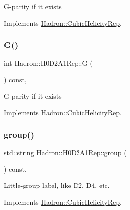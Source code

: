 G-\/parity if it exists 

Implements \mbox{\hyperlink{structHadron_1_1CubicHelicityRep_a50689f42be1e6170aa8cf6ad0597018b}{Hadron\+::\+Cubic\+Helicity\+Rep}}.

\mbox{\label{structHadron_1_1H0D2A1Rep_ae1ebac233a357e3e0be88511400434bc}} 
\subsubsection{\texorpdfstring{G()}{G()}\hspace{0.1cm}{\footnotesize\ttfamily [2/2]}}
{\footnotesize\ttfamily int Hadron\+::\+H0\+D2\+A1\+Rep\+::G (\begin{DoxyParamCaption}{ }\end{DoxyParamCaption}) const\hspace{0.3cm}{\ttfamily [inline]}, {\ttfamily [virtual]}}

G-\/parity if it exists 

Implements \mbox{\hyperlink{structHadron_1_1CubicHelicityRep_a50689f42be1e6170aa8cf6ad0597018b}{Hadron\+::\+Cubic\+Helicity\+Rep}}.

\mbox{\label{structHadron_1_1H0D2A1Rep_a2a8749e8be7f24396cd3156be2e1b037}} 
\subsubsection{\texorpdfstring{group()}{group()}\hspace{0.1cm}{\footnotesize\ttfamily [1/3]}}
{\footnotesize\ttfamily std\+::string Hadron\+::\+H0\+D2\+A1\+Rep\+::group (\begin{DoxyParamCaption}{ }\end{DoxyParamCaption}) const\hspace{0.3cm}{\ttfamily [inline]}, {\ttfamily [virtual]}}

Little-\/group label, like D2, D4, etc. 

Implements \mbox{\hyperlink{structHadron_1_1CubicHelicityRep_a101a7d76cd8ccdad0f272db44b766113}{Hadron\+::\+Cubic\+Helicity\+Rep}}.

\mbox{\label{structHadron_1_1H0D2A1Rep_a2a8749e8be7f24396cd3156be2e1b037}} 
